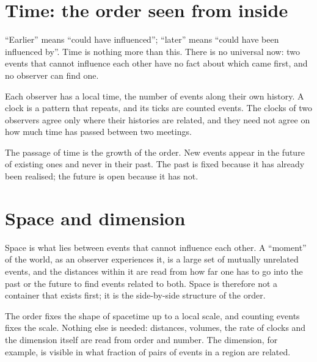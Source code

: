 \section{Time: the order seen from inside}\label{sec:onto-time}

``Earlier'' means ``could have influenced''; ``later'' means ``could have been influenced by''. Time
is nothing more than this. There is no universal now: two events that cannot influence each other
have no fact about which came first, and no observer can find one. 

Each observer has a local time, the number of events along their own history. A clock is a pattern
that repeats, and its ticks are counted events. The clocks of two observers agree only where their
histories are related, and they need not agree on how much time has passed between two meetings.

The passage of time is the growth of the order. New events appear in the future of existing ones and
never in their past. The past is fixed because it has already been realised; the future is open
because it has not. 

\section{Space and dimension}\label{sec:onto-space}

Space is what lies between events that cannot influence each other. A ``moment'' of the world, as
an observer experiences it, is a large set of mutually unrelated events, and the distances within it
are read from how far one has to go into the past or the future to find events related to both. Space
is therefore not a container that exists first; it is the side-by-side structure of the order.

The order fixes the shape of spacetime up to a local scale, and counting events fixes the scale.
Nothing else is needed: distances, volumes, the rate of clocks and the dimension itself are read
from order and number. The dimension, for example, is visible in what fraction of pairs of events
in a region are related. 

